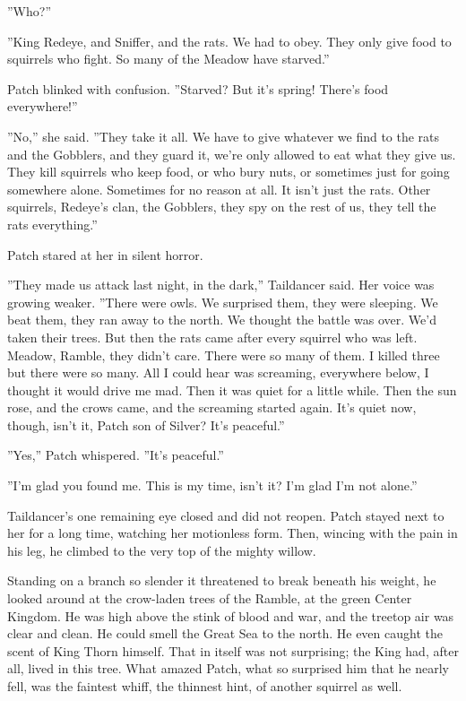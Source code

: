 \documentclass[11pt]{article}
\begin{document}
 ''Who?''\par
 ''King Redeye, and Sniffer, and the rats. We had to obey. They only give food to squirrels who fight. So many of the Meadow have starved.''\par
 Patch blinked with confusion. ''Starved? But it's spring! There's food everywhere!''\par
 ''No,'' she said. ''They take it all. We have to give whatever we find to the rats and the Gobblers, and they guard it, we're only allowed to eat what they give us. They kill squirrels who keep food, or who bury nuts, or sometimes just for going somewhere alone. Sometimes for no reason at all. It isn't just the rats. Other squirrels, Redeye's clan, the Gobblers, they spy on the rest of us, they tell the rats everything.''\par
 Patch stared at her in silent horror.\par
 ''They made us attack last night, in the dark,'' Taildancer said. Her voice was growing weaker. ''There were owls. We surprised them, they were sleeping. We beat them, they ran away to the north. We thought the battle was over. We'd taken their trees. But then the rats came after every squirrel who was left. Meadow, Ramble, they didn't care. There were so many of them. I killed three but there were so many. All I could hear was screaming, everywhere below, I thought it would drive me mad. Then it was quiet for a little while. Then the sun rose, and the crows came, and the screaming started again. It's quiet now, though, isn't it, Patch son of Silver? It's peaceful.''\par
 ''Yes,'' Patch whispered. ''It's peaceful.''\par
 ''I'm glad you found me. This is my time, isn't it? I'm glad I'm not alone.''\par
 Taildancer's one remaining eye closed and did not reopen. Patch stayed next to her for a long time, watching her motionless form. Then, wincing with the pain in his leg, he climbed to the very top of the mighty willow.\par
Standing on a branch so slender it threatened to break beneath his weight, he looked around at the crow-laden trees of the Ramble, at the green Center Kingdom. He was high above the stink of blood and war, and the treetop air was clear and clean. He could smell the Great Sea to the north. He even caught the scent of King Thorn himself. That in itself was not surprising; the King had, after all, lived in this tree. What amazed Patch, what so surprised him that he nearly fell, was the faintest whiff, the thinnest hint, of another squirrel as well.\par
\end{document}

